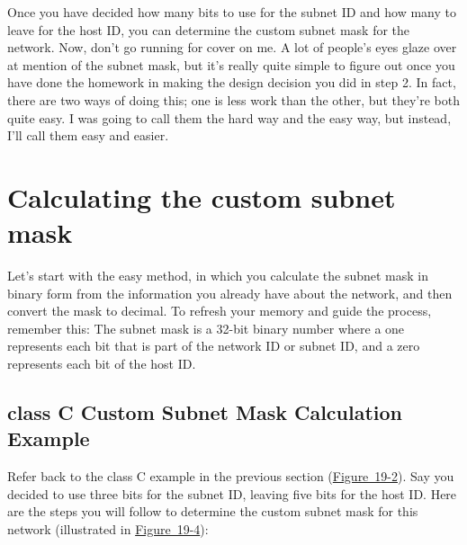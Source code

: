 Once you have decided how many bits to use for the subnet ID and how
many to leave for the host ID, you can determine the custom subnet mask
for the network. Now, don't go running for cover on me. A lot of
people's eyes glaze over at mention of the subnet mask, but it's really
quite simple to figure out once you have done the homework in making the
design decision you did in step 2. In fact, there are two ways of doing
this; one is less work than the other, but they're both quite easy. I
was going to call them the hard way and the easy way, but instead, I'll
call them easy and easier.

\section{Calculating the custom subnet mask}

Let's start with the easy method, in which you calculate the subnet mask
in binary form from the information you already have about the network,
and then convert the mask to decimal. To refresh your memory and guide
the process, remember this: The subnet mask is a 32-bit binary number
where a one represents each bit that is part of the network ID or subnet
ID, and a zero represents each bit of the host ID.

\subsection{class C Custom Subnet Mask Calculation Example}

Refer back to the class C example in the previous section
(\protect\hyperlink{ch19s02.htmlux5cux23example_of_class_c_subnetting_in_this_pa}{Figure~19-2}).
Say you decided to use three bits for the subnet ID, leaving five bits
for the host ID. Here are the steps you will follow to determine the
custom subnet mask for this network (illustrated in
\protect\hyperlink{ch19s03.htmlux5cux23determining_the_custom_subnet_mask_for_a}{Figure~19-4}):

